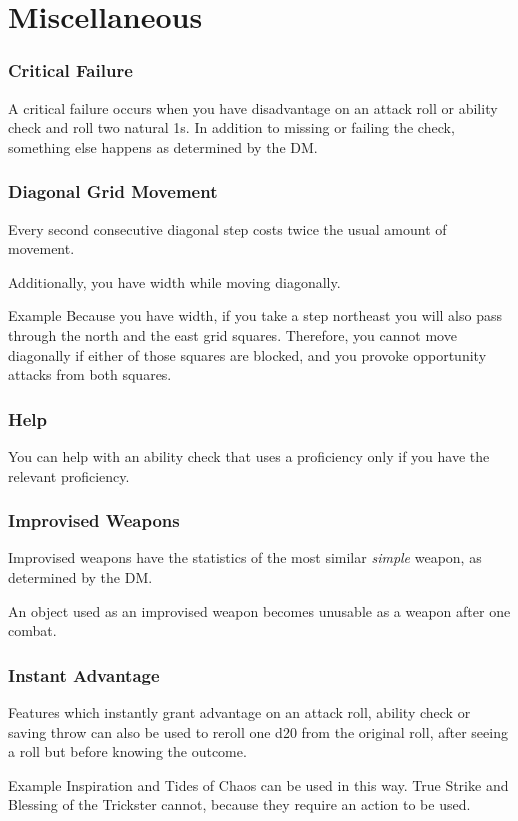 \documentclass[House_Rules.tex]{subfiles}
\begin{document}
\section{Miscellaneous}

\subsubsection{Critical Failure}
A critical failure occurs when you have disadvantage on an attack roll or ability check and roll two natural 1s. In addition to missing or failing the check, something else happens as determined by the DM. 

\subsubsection{Diagonal Grid Movement}

Every second consecutive diagonal step costs twice the usual amount of movement.

Additionally, you have width while moving diagonally.

\begin{DndComment}{Example}
Because you have width, if you take a step northeast you will also pass through the north and the east grid squares. Therefore, you cannot move diagonally if either of those squares are blocked, and you provoke opportunity attacks from both squares.
\end{DndComment}

\subsubsection{Help}
You can help with an ability check that uses a proficiency only if you have the relevant proficiency.

\subsubsection{Improvised Weapons}
Improvised weapons have the statistics of the most similar \textit{simple} weapon, as determined by the DM.

An object used as an improvised weapon becomes unusable as a weapon after one combat.

\subsubsection{Instant Advantage}
Features which instantly grant advantage on an attack roll, ability check or saving throw can also be used to reroll one d20 from the original roll, after seeing a roll but before knowing the outcome.

\begin{DndComment}{Example}
Inspiration and Tides of Chaos can be used in this way. True Strike and Blessing of the Trickster cannot, because they require an action to be used.
\end{DndComment}
\end{document}
